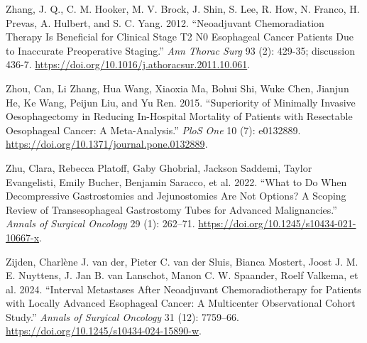 \documentclass[
  letterpaper,
]{scrbook}
\newlength{\cslhangindent}
\newenvironment{CSLReferences}[2] %
 {\begin{list}{}{%
  \setlength{\itemindent}{0pt}
  \setlength{\leftmargin}{0pt}
  \setlength{\parsep}{0pt}
  \ifodd #1
   \setlength{\leftmargin}{\cslhangindent}
   \setlength{\itemindent}{-1\cslhangindent}
  \fi
  \setlength{\itemsep}{#2\baselineskip}}}
 {\end{list}}
\begin{document}
\begin{CSLReferences}{1}{0}
Zhang, J. Q., C. M. Hooker, M. V. Brock, J. Shin, S. Lee, R. How, N.
Franco, H. Prevas, A. Hulbert, and S. C. Yang. 2012. {``Neoadjuvant
Chemoradiation Therapy Is Beneficial for Clinical Stage {T2} {N0}
Esophageal Cancer Patients Due to Inaccurate Preoperative Staging.''}
\emph{Ann Thorac Surg} 93 (2): 429-35; discussion 436-7.
\url{https://doi.org/10.1016/j.athoracsur.2011.10.061}.

Zhou, Can, Li Zhang, Hua Wang, Xiaoxia Ma, Bohui Shi, Wuke Chen, Jianjun
He, Ke Wang, Peijun Liu, and Yu Ren. 2015. {``Superiority of {Minimally}
{Invasive} {Oesophagectomy} in {Reducing} {In}-{Hospital} {Mortality} of
{Patients} with {Resectable} {Oesophageal} {Cancer}: {A}
{Meta}-{Analysis}.''} \emph{PloS One} 10 (7): e0132889.
\url{https://doi.org/10.1371/journal.pone.0132889}.

Zhu, Clara, Rebecca Platoff, Gaby Ghobrial, Jackson Saddemi, Taylor
Evangelisti, Emily Bucher, Benjamin Saracco, et al. 2022. {``What to Do
{When} {Decompressive} {Gastrostomies} and {Jejunostomies} Are Not
{Options}? {A} {Scoping} {Review} of {Transesophageal} {Gastrostomy}
{Tubes} for {Advanced} {Malignancies}.''} \emph{Annals of Surgical
Oncology} 29 (1): 262--71.
\url{https://doi.org/10.1245/s10434-021-10667-x}.

Zijden, Charlène J. van der, Pieter C. van der Sluis, Bianca Mostert,
Joost J. M. E. Nuyttens, J. Jan B. van Lanschot, Manon C. W. Spaander,
Roelf Valkema, et al. 2024. {``Interval {Metastases} {After}
{Neoadjuvant} {Chemoradiotherapy} for {Patients} with {Locally}
{Advanced} {Esophageal} {Cancer}: {A} {Multicenter} {Observational}
{Cohort} {Study}.''} \emph{Annals of Surgical Oncology} 31 (12):
7759--66. \url{https://doi.org/10.1245/s10434-024-15890-w}.

\end{CSLReferences}


\backmatter
\end{document}
